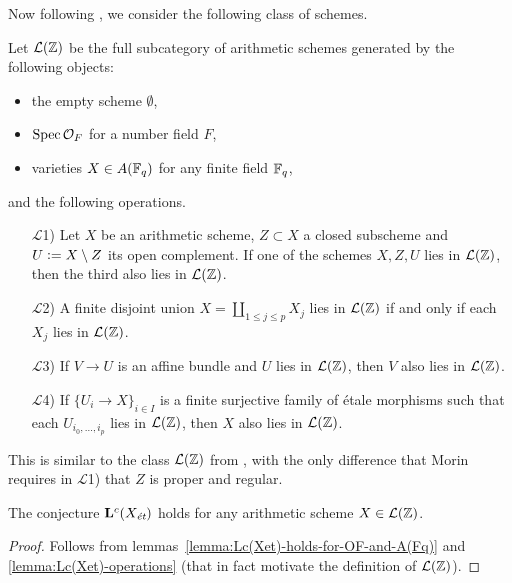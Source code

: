 \documentclass{article}
\numberwithin{equation}{section}
\begin{document}
Now following \cite{Morin-2014}, we consider the following class of schemes.

\begin{definition}
  Let $\mathcal{L} (\ZZ)$ be the full subcategory of arithmetic schemes
  generated by the following objects:
  \begin{itemize}
  \item the empty scheme $\emptyset$,
  \item $\Spec \mathcal{O}_F$ for a number field $F$,
  \item varieties $X \in A (\FF_q)$ for any finite field $\FF_q$,
  \end{itemize}
  and the following operations.
  \begin{enumerate}
  \item[$\mathcal{L}$1)] Let $X$ be an arithmetic scheme, $Z \subset X$ a closed
    subscheme and $U \dfn X\setminus Z$ its open complement. If one of the
    schemes $X,Z,U$ lies in $\mathcal{L} (\ZZ)$, then the third also lies in
    $\mathcal{L} (\ZZ)$.

  \item[$\mathcal{L}$2)] A finite disjoint union
    $X = \coprod_{1 \le j \le p} X_j$ lies in $\mathcal{L} (\ZZ)$ if and only if
    each $X_j$ lies in $\mathcal{L} (\ZZ)$.

  \item[$\mathcal{L}$3)] If $V \to U$ is an affine bundle and $U$ lies in
    $\mathcal{L} (\ZZ)$, then $V$ also lies in $\mathcal{L} (\ZZ)$.

  \item[$\mathcal{L}$4)] If $\{ U_i \to X \}_{i \in I}$ is a finite surjective
    family of étale morphisms such that each $U_{i_0,\ldots,i_p}$ lies in
    $\mathcal{L} (\ZZ)$, then $X$ also lies in $\mathcal{L} (\ZZ)$.
  \end{enumerate}
\end{definition}

This is similar to the class $\mathcal{L} (\ZZ)$ from
\cite[Definition~5.9]{Morin-2014}, with the only difference that Morin requires
in $\mathcal{L}$1) that $Z$ is proper and regular.

\begin{proposition}
  The conjecture $\mathbf{L}^c (X_\et)$ holds for any arithmetic scheme
  $X \in \mathcal{L} (\ZZ)$.

  \begin{proof}
    Follows from lemmas~\ref{lemma:Lc(Xet)-holds-for-OF-and-A(Fq)} and
    \ref{lemma:Lc(Xet)-operations} (that in fact motivate the definition of
    $\mathcal{L} (\ZZ)$).
  \end{proof}
\end{proposition}
\end{document}
